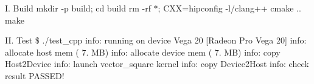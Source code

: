 I. Build mkdir -\/p build; cd build rm -\/rf $\ast$; CXX={\ttfamily hipconfig -\/l}/clang++ cmake .. make

II. Test \$ ./test\+\_\+cpp info\+: running on device Vega 20 \mbox{[}Radeon Pro Vega 20\mbox{]} info\+: allocate host mem ( 7. MB) info\+: allocate device mem ( 7. MB) info\+: copy Host2\+Device info\+: launch \textquotesingle{}vector\+\_\+square\textquotesingle{} kernel info\+: copy Device2\+Host info\+: check result PASSED! 